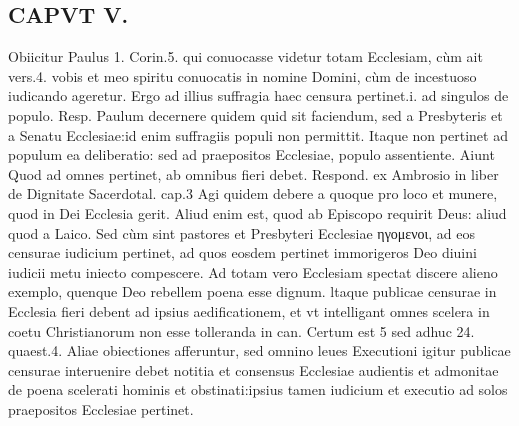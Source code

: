 \documentclass{article}
\begin{document}
\begin{pages}
\section*{CAPVT V. }
\marginpar{[ p.247 ]} Obiicitur Paulus 1. Corin.5. qui conuocasse videtur totam Ecclesiam, cùm ait vers.4. vobis et meo spiritu conuocatis in nomine Domini, cùm de incestuoso iudicando ageretur. Ergo ad illius suffragia haec censura pertinet.i. ad singulos de populo. Resp. Paulum decernere quidem quid sit faciendum, sed a Presbyteris et a Senatu Ecclesiae:id enim suffragiis populi non permittit. Itaque non pertinet ad populum ea deliberatio: sed ad praepositos Ecclesiae, populo assentiente. Aiunt Quod ad omnes pertinet, ab omnibus fieri debet. Respond. ex Ambrosio in liber  de Dignitate Sacerdotal. cap.3 Agi quidem debere a quoque pro loco et munere, quod in Dei Ecclesia gerit. Aliud enim est, quod ab Episcopo requirit Deus: aliud quod a Laico. Sed cùm sint pastores et Presbyteri Ecclesiae ηγομενοι, ad eos censurae iudicium pertinet, ad quos eosdem pertinet immorigeros Deo diuini iudicii metu iniecto compescere. Ad totam vero Ecclesiam spectat discere alieno exemplo, quenque Deo rebellem poena esse dignum. ltaque publicae censurae in Ecclesia fieri debent ad ipsius aedificationem, et vt intelligant omnes scelera in coetu Christianorum non esse tolleranda in can. Certum est 5 sed adhuc 24. quaest.4. Aliae obiectiones afferuntur, sed omnino leues Executioni igitur publicae censurae interuenire debet notitia et consensus Ecclesiae audientis et admonitae de poena scelerati hominis et obstinati:ipsius tamen iudicium et executio ad solos praepositos Ecclesiae pertinet.  \pend

\end{pages}
\end{document}
